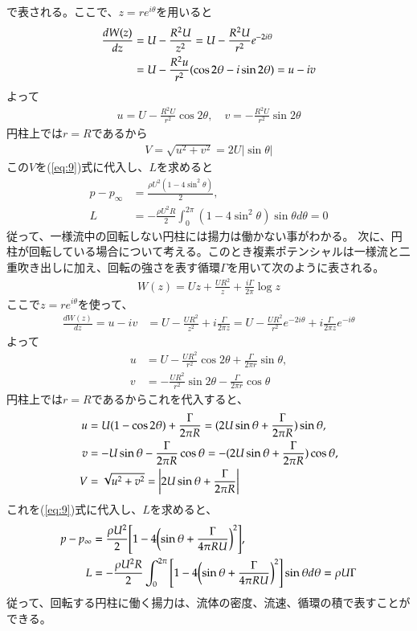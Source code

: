 \documentclass[10pt,b5paper,papersize,dvipdfmx]{jsbook}
\begin{document}
で表される。ここで、$z = re^{i\theta}$を用いると
\begin{align}
  \frac{dW(z)}{dz}
  &= U - \frac{R^2U}{z^2}
  = U - \frac{R^2U}{r^2}e^{-2i\theta} \notag \\
  &= U - \frac{R^2u}{r^2}(\cos2\theta - i\sin2\theta)
  = u - iv
\end{align}
よって
\begin{align}
  u = U - \frac{R^2U}{r^2} \cos2\theta,\quad
  v = -\frac{R^2U}{r^2} \sin2\theta
\end{align}
円柱上では$r = R$であるから
\begin{align}
  V = \sqrt{u^2+v^2}
    = 2U|\sin\theta|
\end{align}
この$V$を(\ref{eq:9})式に代入し、$L$を求めると
\begin{align}
  p - p_\infty &= \frac{\rho U^2(1 - 4\sin^2\theta)}{2}, \\
  L &= -\frac{\rho U^2R}{2} \int_0^{2\pi} (1 - 4\sin^2\theta) \sin\theta d\theta 
    = 0
\end{align}
従って、一様流中の回転しない円柱には揚力は働かない事がわかる。
次に、円柱が回転している場合について考える。このとき複素ポテンシャルは一様流と二重吹き出しに加え、回転の強さを表す循環$\Gamma$を用いて次のように表される。
\begin{align}
  W(z) = Uz + \frac{UR^2}{z} + \frac{i\Gamma}{2\pi} \log z
\end{align}
ここで$z=re^{i\theta}$を使って、
\begin{align}
  \frac{dW(z)}{dz}
  = u - iv
  &= U - \frac{UR^2}{z^2} + i\frac{\Gamma}{2\pi z}
  = U - \frac{UR^2}{r^2}e^{-2i\theta} + i\frac{\Gamma}{2\pi z}e^{-i\theta}
\end{align}
よって
\begin{align}
  u &= U - \frac{UR^2}{r^2}\cos 2\theta + \frac{\Gamma}{2\pi r}\sin\theta,\\
  v &= -\frac{UR^2}{r^2}\sin 2\theta - \frac{\Gamma}{2\pi r}\cos\theta
\end{align}
円柱上では$r = R$であるからこれを代入すると、
\begin{align}
  u &= U(1 - \cos 2\theta) + \frac{\Gamma}{2\pi R}
    = (2U\sin\theta + \frac{\Gamma}{2\pi R})\sin\theta,\\
  v &= -U\sin\theta - \frac{\Gamma}{2\pi R}\cos\theta
    = -(2U\sin\theta + \frac{\Gamma}{2\pi R})\cos\theta,\\
  V &= \sqrt{u^2 + v^2} = \qty|2U\sin\theta + \frac{\Gamma}{2\pi R}|
\end{align}
これを(\ref{eq:9})式に代入し、$L$を求めると、
\begin{align}
  p - p_\infty &= \frac{\rho U^2}{2} \qty[1 - 4\qty(\sin\theta + \frac{\Gamma}{4\pi RU})^2],\\
  L &= -\frac{\rho U^2R}{2}\int_0^{2\pi} \qty[1 - 4\qty(\sin\theta + \frac{\Gamma}{4\pi RU})^2]\sin\theta d\theta %
    = \rho U\Gamma
  \label{eq:26}
\end{align}
従って、回転する円柱に働く揚力は、流体の密度、流速、循環の積で表すことができる。
\end{document}
